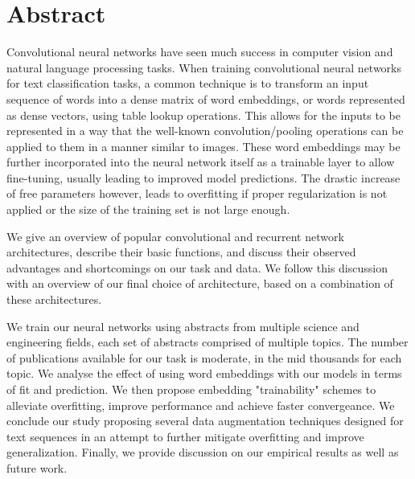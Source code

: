 

\chapter*{Abstract}
Convolutional neural networks have seen much success in computer vision and natural language processing tasks.
When training convolutional neural networks for text classification tasks, a common technique is to transform an input
sequence of words into a dense matrix of word embeddings, or words represented as dense vectors, using table lookup
operations. This allows for the inputs to be represented in a way that the well-known convolution/pooling operations can be applied
to them in a manner similar to images. These word embeddings may be further incorporated into the neural
network itself as a trainable layer to allow fine-tuning, usually leading to improved model predictions.
The drastic increase of free parameters however, leads to overfitting if proper regularization is not applied or the size of
the training set is not large enough.

We give an overview of popular convolutional and recurrent network architectures, describe their basic functions, and discuss their
observed advantages and shortcomings on our task and data. We follow this discussion with an overview of our final choice of architecture,
based on a combination of these architectures.

We train our neural networks using abstracts from multiple science and engineering fields, each set of
abstracts comprised of multiple topics. The number of publications available for our task is moderate, in the mid thousands for each topic.
We analyse the effect of using word embeddings with our models in terms of fit and prediction. We then propose embedding "trainability" schemes
to alleviate overfitting, improve performance and achieve faster convergeance. We conclude our study proposing several data augmentation
techniques designed for text sequences in an attempt to further mitigate overfitting and improve generalization.
Finally, we provide discussion on our empirical results as well as future work.

